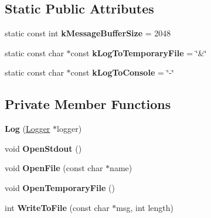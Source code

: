 \subsection*{Static Public Attributes}
\begin{DoxyCompactItemize}
\item 
static const int {\bfseries k\+Message\+Buffer\+Size} = 2048\hypertarget{classv8_1_1internal_1_1_log_a533184192668b0b2d4b7a241e8eb28ec}{}\label{classv8_1_1internal_1_1_log_a533184192668b0b2d4b7a241e8eb28ec}

\item 
static const char $\ast$const {\bfseries k\+Log\+To\+Temporary\+File} = \char`\"{}\&\char`\"{}\hypertarget{classv8_1_1internal_1_1_log_a89565991012a486da0e90f15a749c3d3}{}\label{classv8_1_1internal_1_1_log_a89565991012a486da0e90f15a749c3d3}

\item 
static const char $\ast$const {\bfseries k\+Log\+To\+Console} = \char`\"{}-\/\char`\"{}\hypertarget{classv8_1_1internal_1_1_log_a92f1f316f4e0eb7ae4e05cb420f9af50}{}\label{classv8_1_1internal_1_1_log_a92f1f316f4e0eb7ae4e05cb420f9af50}

\end{DoxyCompactItemize}
\subsection*{Private Member Functions}
\begin{DoxyCompactItemize}
\item 
{\bfseries Log} (\hyperlink{classv8_1_1internal_1_1_logger}{Logger} $\ast$logger)\hypertarget{classv8_1_1internal_1_1_log_a9151da48a448341a6b7890cc51e75d9a}{}\label{classv8_1_1internal_1_1_log_a9151da48a448341a6b7890cc51e75d9a}

\item 
void {\bfseries Open\+Stdout} ()\hypertarget{classv8_1_1internal_1_1_log_a648b7346fd4f8022f61478e5a3b2b482}{}\label{classv8_1_1internal_1_1_log_a648b7346fd4f8022f61478e5a3b2b482}

\item 
void {\bfseries Open\+File} (const char $\ast$name)\hypertarget{classv8_1_1internal_1_1_log_a6bfef23374f2bf70bf8a05959c41850d}{}\label{classv8_1_1internal_1_1_log_a6bfef23374f2bf70bf8a05959c41850d}

\item 
void {\bfseries Open\+Temporary\+File} ()\hypertarget{classv8_1_1internal_1_1_log_a115ea0f151116e6424ae7a943c386ea6}{}\label{classv8_1_1internal_1_1_log_a115ea0f151116e6424ae7a943c386ea6}

\item 
int {\bfseries Write\+To\+File} (const char $\ast$msg, int length)\hypertarget{classv8_1_1internal_1_1_log_a7a89312e2f0ea6d38994aded4a93066a}{}\label{classv8_1_1internal_1_1_log_a7a89312e2f0ea6d38994aded4a93066a}

\end{DoxyCompactItemize}
